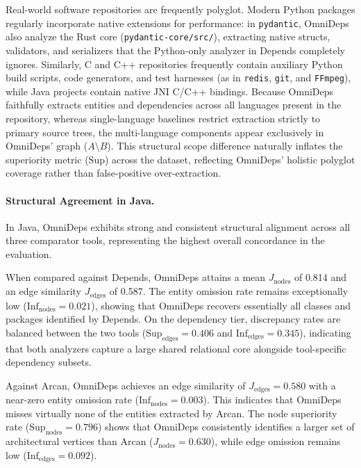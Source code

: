 Real-world software repositories are frequently polyglot. Modern Python packages
regularly incorporate native extensions for performance: in
\texttt{pydantic}, OmniDeps
also analyze the Rust core (\texttt{pydantic-core/src/}), extracting native
structs, validators, and serializers that the Python-only analyzer in
Depends completely
ignores. Similarly, C and C++ repositories frequently contain
auxiliary Python build
scripts, code generators, and test harnesses (as in \texttt{redis},
  \texttt{git}, and
\texttt{FFmpeg}), while Java projects contain native JNI C/C++
bindings. Because OmniDeps
faithfully extracts entities and dependencies across all languages
present in the repository,
whereas single-language baselines restrict extraction strictly to
primary source trees,
the multi-language components appear exclusively in OmniDeps' graph
($A \setminus B$).
This structural scope difference naturally inflates the superiority
metric ($\text{Sup}$)
across the dataset, reflecting OmniDeps' holistic polyglot coverage rather than
false-positive over-extraction.

\paragraph{Structural Agreement in Java.}
In Java, OmniDeps exhibits strong and consistent structural alignment
across all three comparator tools, representing the highest overall
concordance in the evaluation.

When compared against Depends, OmniDeps attains a mean
$J_{\text{nodes}}$ of 0.814 and an edge similarity $J_{\text{edges}}$
of 0.587. The entity omission rate remains exceptionally low
($\text{Inf}_{\text{nodes}} = 0.021$), showing that OmniDeps recovers
essentially all classes and packages identified by Depends. On the
dependency tier, discrepancy rates are balanced between the two tools
($\text{Sup}_{\text{edges}} = 0.406$ and $\text{Inf}_{\text{edges}} =
0.345$), indicating that both analyzers capture a large shared
relational core alongside tool-specific dependency subsets.

Against Arcan, OmniDeps achieves an edge similarity of
$J_{\text{edges}} = 0.580$ with a near-zero entity omission rate
($\text{Inf}_{\text{nodes}} = 0.003$). This indicates that OmniDeps
misses virtually none of the entities extracted by Arcan. The node
superiority rate ($\text{Sup}_{\text{nodes}} = 0.796$) shows that
OmniDeps consistently identifies a larger set of architectural
vertices than Arcan ($J_{\text{nodes}} = 0.630$), while edge omission
remains low ($\text{Inf}_{\text{edges}} = 0.092$).

